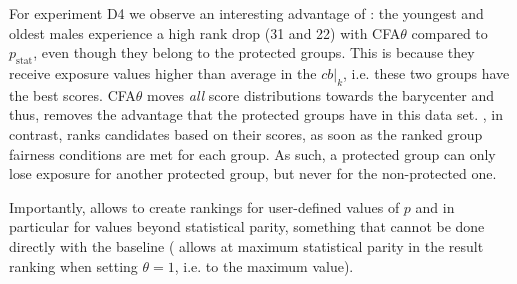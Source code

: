 For experiment D4 we observe an interesting advantage of \algoFAIR: the youngest and oldest males experience a high rank drop (31 and 22) with CFA$\theta$ compared to \algoFAIR $p_{\text{stat}}$, even though they belong to the protected groups.
%
This is because they receive exposure values higher than average in the $cb|_k$, i.e. these two groups have the best scores.
%
CFA$\theta$ moves \emph{all} score distributions towards the barycenter and thus, removes the advantage that the protected groups have in this data set.
%
\algoFAIR, in contrast, ranks candidates based on their scores, as soon as the ranked group fairness conditions are met for each group.
%
As such, a protected group can only lose exposure for another protected group, but never for the non-protected one.

Importantly, \algoFAIR allows to create rankings for user-defined values of $p$ and in particular for values beyond statistical parity, something that cannot be done directly with the baseline (\citet{zehlike2020matching} allows at maximum statistical parity in the result ranking when setting $\theta=1$, i.e. to the maximum value).


